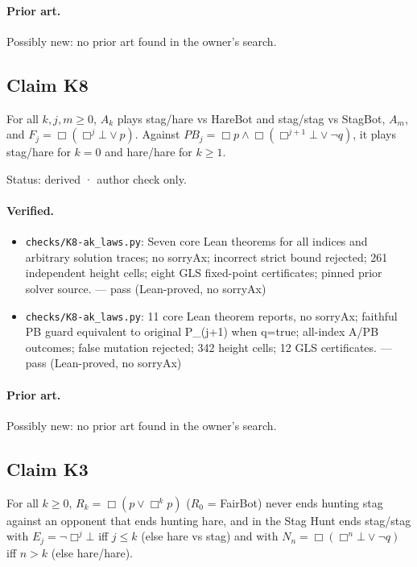 \documentclass{article}
\begin{document}
\paragraph{Prior art.} Possibly new: no prior art found in the owner's search.

\subsection*{Claim K8}

For all $k,j,m\ge0$, $A_k$ plays stag/hare vs HareBot and stag/stag vs StagBot, $A_m$, and $F_j=\Box(\Box^j\bot\lor p)$. Against $PB_j=\Box p\land\Box(\Box^{j+1}\bot\lor\neg q)$, it plays stag/hare for $k=0$ and hare/hare for $k\ge1$.

Status: derived · author check only.

\paragraph{Verified.}
\begin{itemize}
\item \texttt{checks/K8-ak\_laws.py}: Seven core Lean theorems for all indices and arbitrary solution traces; no sorryAx; incorrect strict bound rejected; 261 independent height cells; eight GLS fixed-point certificates; pinned prior solver source. --- pass (Lean-proved, no sorryAx)
\item \texttt{checks/K8-ak\_laws.py}: 11 core Lean theorem reports, no sorryAx; faithful PB guard equivalent to original P\_(j+1) when q=true; all-index A/PB outcomes; false mutation rejected; 342 height cells; 12 GLS certificates. --- pass (Lean-proved, no sorryAx)
\end{itemize}

\paragraph{Prior art.} Possibly new: no prior art found in the owner's search.

\subsection*{Claim K3}

For all $k\ge0$, $R_k=\Box(p\lor\Box^kp)$ ($R_0$ = FairBot) never ends hunting stag against an opponent that ends hunting hare, and in the Stag Hunt ends stag/stag with $E_j=\neg\Box^j\bot$ iff $j\le k$ (else hare vs stag) and with $N_n=\Box(\Box^n\bot\lor\neg q)$ iff $n>k$ (else hare/hare).
\end{document}
